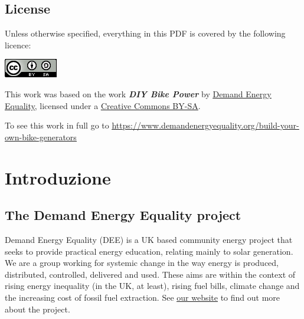 \documentclass{article}
\theoremstyle{definition}
\theoremstyle{definition}
\theoremstyle{remark}
\begin{document}
  \subsection*{License} %
  \label{sub:license}

    Unless otherwise specified, everything in this PDF is covered by the following licence:

    \includegraphics[]{../Images/image_0_2_(license).png} \newline

    This work was based on the work \textbf{\textit{DIY Bike Power}} by \href{https://www.demandenergyequality.org/}{\underline{Demand Energy Equality}}, licensed under a \href{https://creativecommons.org/licenses/by-sa/4.0/legalcode}{\underline{Creative Commons BY-SA}}.

    To see this work in full go to \href{https://www.demandenergyequality.org/build-your-own-bike-generators}{\underline{https://www.demandenergyequality.org/build-your-own-bike-generators}}
  


\newpage

{\color{blue}\section{Introduzione}} %
\label{sec:introduzione}

  {\color{blue}\subsection{The Demand Energy Equality project}} %
  \label{sub:the_demand_energy_equality_project}

    Demand Energy Equality (DEE) is a UK based community energy project that seeks to provide practical energy education, relating mainly to solar generation. We are a group working for systemic change in the way energy is produced, distributed, controlled, delivered and used. These aims are within the context of rising energy inequality (in the UK, at least), rising fuel bills, climate change and the increasing cost of fossil fuel extraction. See \href{https://www.demandenergyequality.org/about/}{\underline{our website}} to find out more about the project.
\end{document}
